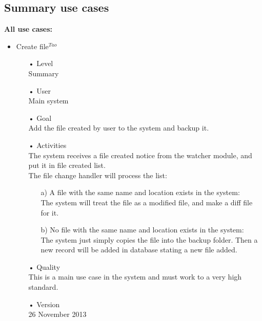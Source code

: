 \documentclass[12pt,a4paper]{article}
\begin{document}
\subsection{Summary use cases}
\textbf{All use cases:}
\begin{itemize}
\item Create file$^{Tao}$
\begin{enumerate}
	\item[•] Level \hfill \\
	Summary
	\item[•] User \hfill \\
	Main system
	\item[•] Goal \hfill \\
	Add the file created by user to the system and backup it.
	\item[•] Activities \hfill \\
	The system receives a file created notice from the watcher module, and put it in file created list.\\
	The file change handler will process the list:
	\begin{enumerate}
		\item[a)]A file with the same name and location exists in the system: 
		\hfill \\
		The system will treat the file as a modified file, and make a diff  file for it.

		\item[b)]No file with the same name and location exists in the system: 
		\hfill \\
		The system just simply copies the file into the backup folder. Then a new record will be added in database stating a new file added.
	\end{enumerate}
	\item[•] Quality \hfill \\
	This is a main use case in the system and must work to a very high standard.
	\item[•] Version \hfill \\
	26 November 2013	
\end{enumerate}
	

\end{itemize}
\end{document}
